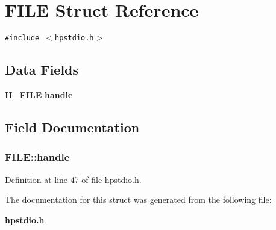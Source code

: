 \section{FILE Struct Reference}
\label{structFILE}
{\tt \#include $<$hpstdio.h$>$}

\subsection*{Data Fields}
\begin{CompactItemize}
\item 
{\bf H\_\-FILE} {\bf handle}
\end{CompactItemize}


\subsection{Field Documentation}
\subsubsection{ FILE::handle}\label{structFILE_m0}




Definition at line 47 of file hpstdio.h.

The documentation for this struct was generated from the following file:\begin{CompactItemize}
\item 
{\bf hpstdio.h}\end{CompactItemize}
